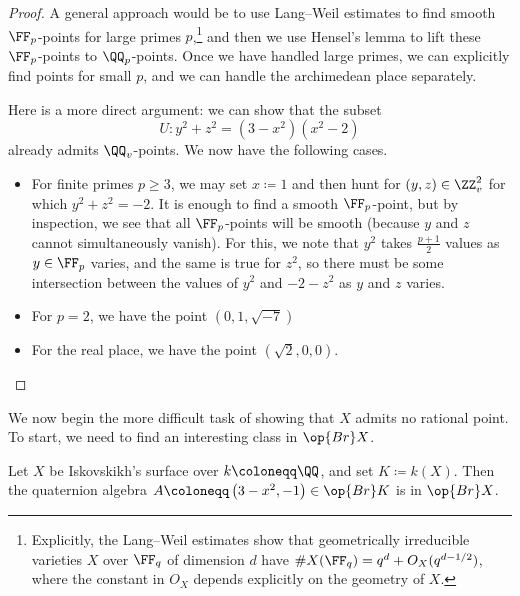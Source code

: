 \documentclass[../notes.tex]{subfiles}
\begin{document}
\begin{proof}
	A general approach would be to use Lang--Weil estimates to find smooth $\FF_p$-points for large primes $p$,\footnote{Explicitly, the Lang--Weil estimates show that geometrically irreducible varieties $X$ over $\FF_q$ of dimension $d$ have $\#X(\FF_q)=q^d+O_X(q^{d-1/2})$, where the constant in $O_X$ depends explicitly on the geometry of $X$.} and then we use Hensel's lemma to lift these $\FF_p$-points to $\QQ_p$-points. Once we have handled large primes, we can explicitly find points for small $p$, and we can handle the archimedean place separately.

	Here is a more direct argument: we can show that the subset
	\[U\colon y^2+z^2=\left(3-x^2\right)\left(x^2-2\right)\]
	already admits $\QQ_v$-points. We now have the following cases.
	\begin{itemize}
		\item For finite primes $p\ge3$, we may set $x\coloneqq1$ and then hunt for $(y,z)\in\ZZ_v^2$ for which $y^2+z^2=-2$. It is enough to find a smooth $\FF_p$-point, but by inspection, we see that all $\FF_p$-points will be smooth (because $y$ and $z$ cannot simultaneously vanish). For this, we note that $y^2$ takes $\frac{p+1}2$ values as $y\in\FF_p$ varies, and the same is true for $z^2$, so there must be some intersection between the values of $y^2$ and $-2-z^2$ as $y$ and $z$ varies.
		\item For $p=2$, we have the point $(0,1,\sqrt{-7})$
		\item For the real place, we have the point $(\sqrt2,0,0)$.
		\qedhere
	\end{itemize}
\end{proof}
We now begin the more difficult task of showing that $X$ admits no rational point. To start, we need to find an interesting class in $\op{Br}X$.
\begin{lemma} \label{lem:isok-quaternion}
	Let $X$ be Iskovskikh's surface over $k\coloneqq\QQ$, and set $K\coloneqq k(X)$. Then the quaternion algebra $A\coloneqq\left(3-x^2,-1\right)\in\op{Br}K$ is in $\op{Br}X$.
\end{lemma}
\end{document}
